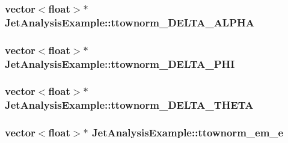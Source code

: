 \subsubsection[{\texorpdfstring{ttownorm\+\_\+\+D\+E\+L\+T\+A\+\_\+\+A\+L\+P\+HA}{ttownorm_DELTA_ALPHA}}]{\setlength{\rightskip}{0pt plus 5cm}vector$<$float$>$$\ast$ Jet\+Analysis\+Example\+::ttownorm\+\_\+\+D\+E\+L\+T\+A\+\_\+\+A\+L\+P\+HA}\hypertarget{classJetAnalysisExample_ae38b3dbe437d38c51f66c5f3d677343d}{}\label{classJetAnalysisExample_ae38b3dbe437d38c51f66c5f3d677343d}
\subsubsection[{\texorpdfstring{ttownorm\+\_\+\+D\+E\+L\+T\+A\+\_\+\+P\+HI}{ttownorm_DELTA_PHI}}]{\setlength{\rightskip}{0pt plus 5cm}vector$<$float$>$$\ast$ Jet\+Analysis\+Example\+::ttownorm\+\_\+\+D\+E\+L\+T\+A\+\_\+\+P\+HI}\hypertarget{classJetAnalysisExample_a14e7e855e15d65dbb5f18fdcc095bd94}{}\label{classJetAnalysisExample_a14e7e855e15d65dbb5f18fdcc095bd94}
\subsubsection[{\texorpdfstring{ttownorm\+\_\+\+D\+E\+L\+T\+A\+\_\+\+T\+H\+E\+TA}{ttownorm_DELTA_THETA}}]{\setlength{\rightskip}{0pt plus 5cm}vector$<$float$>$$\ast$ Jet\+Analysis\+Example\+::ttownorm\+\_\+\+D\+E\+L\+T\+A\+\_\+\+T\+H\+E\+TA}\hypertarget{classJetAnalysisExample_a55d8ca98c3b7c7523c3e3773ea41c2fb}{}\label{classJetAnalysisExample_a55d8ca98c3b7c7523c3e3773ea41c2fb}
\subsubsection[{\texorpdfstring{ttownorm\+\_\+em\+\_\+e}{ttownorm_em_e}}]{\setlength{\rightskip}{0pt plus 5cm}vector$<$float$>$$\ast$ Jet\+Analysis\+Example\+::ttownorm\+\_\+em\+\_\+e}\hypertarget{classJetAnalysisExample_ab387c05df14969295a4211d8f1d689dc}{}\label{classJetAnalysisExample_ab387c05df14969295a4211d8f1d689dc}
